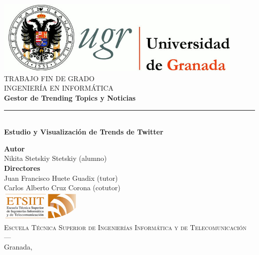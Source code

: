 \begin{titlepage}
 
 
\newlength{\centeroffset}
\setlength{\centeroffset}{-0.5\oddsidemargin}
\addtolength{\centeroffset}{0.5\evensidemargin}
\thispagestyle{empty}

\noindent\hspace*{\centeroffset}\begin{minipage}{\textwidth}

\centering
\includegraphics[width=0.9\textwidth]{gfx/logo_ugr.jpg}\\[1.5cm]

\textsc{ \Large TRABAJO FIN DE GRADO\\[0.2cm]}
\textsc{ INGENIERÍA EN INFORMÁTICA}\\[1.3cm]
% 
{\Huge\bfseries Gestor de Trending Topics y Noticias\\
}
\noindent\rule[-1ex]{\textwidth}{3pt}\\[3ex]
{\large\bfseries Estudio y Visualización de Trends de Twitter}
\end{minipage}

\vspace{1.5cm}
\noindent\hspace*{\centeroffset}\begin{minipage}{\textwidth}
\centering

\textbf{Autor}\\ {Nikita Stetskiy Stetskiy (alumno)}\\[1.3cm]
\textbf{Directores}\\
{Juan Francisco Huete Guadix (tutor)\\
Carlos Alberto Cruz Corona (cotutor)}\\[1.3cm]
\includegraphics[width=0.3\textwidth]{gfx/etsiit_logo.png}\\[0.1cm]
\textsc{Escuela Técnica Superior de Ingenierías Informática y de Telecomunicación}\\[0.03cm]
\textsc{---}\\[0.03cm]
Granada, \myTime
\end{minipage}
\end{titlepage}

\cleardoublepage